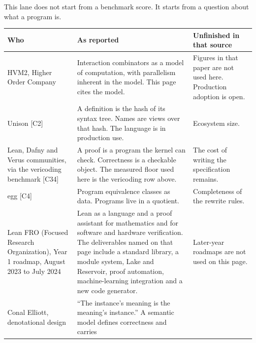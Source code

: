 \documentclass[10pt,letterpaper]{article}
\begin{document}
This lane does not start from a benchmark score. It starts from a
question about what a program is.

{\footnotesize\setlength{\tabcolsep}{3.8pt}\renewcommand{\arraystretch}{1.15}
\begin{longtable}[]{@{}
  >{\raggedright\arraybackslash}p{}
  >{\raggedright\arraybackslash}p{}
  >{\raggedright\arraybackslash}p{}@{}}
\toprule\noalign{}
\begin{minipage}[b]{\linewidth}\raggedright
\textbf{Who}
\end{minipage} & \begin{minipage}[b]{\linewidth}\raggedright
\textbf{As reported}
\end{minipage} & \begin{minipage}[b]{\linewidth}\raggedright
\textbf{Unfinished in that source}
\end{minipage} \\
\midrule\noalign{}
\endhead
\bottomrule\noalign{}
\endlastfoot
HVM2, Higher Order Company & Interaction combinators as a model of
computation, with parallelism inherent in the model. This page cites the
model. & Figures in that paper are not used here. Production adoption is
open. \\
Unison {[}C2{]} & A definition is the hash of its syntax tree. Names are
views over that hash. The language is in production use. & Ecosystem
size. \\
Lean, Dafny and Verus communities, via the vericoding benchmark
{[}C34{]} & A proof is a program the kernel can check. Correctness is a
checkable object. The measured floor used here is the vericoding row
above. & The cost of writing the specification remains. \\
egg {[}C4{]} & Program equivalence classes as data. Programs live in a
quotient. & Completeness of the rewrite rules. \\
Lean FRO (Focused Research Organization), Year 1 roadmap, August 2023 to
July 2024 & Lean as a language and a proof assistant for mathematics and
for software and hardware verification. The deliverables named on that
page include a standard library, a module system, Lake and Reservoir,
proof automation, machine-learning integration and a new code generator.
& Later-year roadmaps are not used on this page. \\
Conal Elliott, denotational design & ``The instance's meaning is the
meaning's instance.'' A semantic model defines correctness and carries

\end{longtable}}
\end{document}
